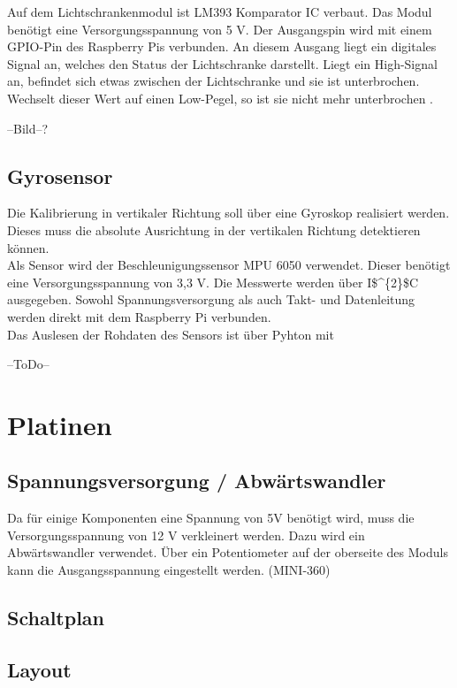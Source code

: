 Auf dem Lichtschrankenmodul ist LM393 Komparator \ac{IC} verbaut. Das Modul benötigt eine Versorgungsspannung von 5 V. Der Ausgangspin wird mit einem \ac{GPIO}-Pin des Raspberry Pis verbunden. An diesem Ausgang liegt ein digitales Signal an, welches den Status der Lichtschranke darstellt. Liegt ein High-Signal an, befindet sich etwas zwischen der Lichtschranke und sie ist unterbrochen. Wechselt dieser Wert auf einen Low-Pegel, so ist sie nicht mehr unterbrochen \cite{LM393}.

--Bild--?


\subsection{Gyrosensor}

Die Kalibrierung in vertikaler Richtung soll über eine Gyroskop realisiert werden. Dieses muss die absolute Ausrichtung in der vertikalen Richtung detektieren können. \\
Als Sensor wird der Beschleunigungssensor MPU 6050 verwendet. Dieser benötigt eine Versorgungsspannung von 3,3 V. Die Messwerte werden über \ac{I$^{2}$C} ausgegeben. Sowohl Spannungsversorgung als auch Takt- und Datenleitung werden direkt mit dem Raspberry Pi verbunden. \\
Das Auslesen der Rohdaten des Sensors ist über Pyhton mit    


--ToDo--




\section{Platinen}

\subsection{Spannungsversorgung / Abwärtswandler}

Da für einige Komponenten eine Spannung von 5V benötigt wird, muss die Versorgungsspannung von 12 V verkleinert werden. Dazu wird ein Abwärtswandler verwendet. Über ein Potentiometer auf der oberseite des Moduls kann die Ausgangsspannung eingestellt werden. (MINI-360)

\subsection{Schaltplan}


\subsection{Layout}








